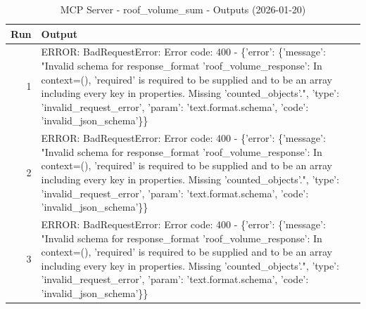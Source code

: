 \begin{table}[ht]
\centering
\small
\caption{MCP Server - roof\_volume\_sum - Outputs (2026-01-20)}
\label{tab:mcp\_roof\_volume\_sum\_outputs\_2026-01-20}
\begin{tabularx}{\linewidth}{r X}
\hline
Run & Output \\
\hline
1 & ERROR: BadRequestError: Error code: 400 - \{'error': \{'message': "Invalid schema for response\_format 'roof\_volume\_response': In context=(), 'required' is required to be supplied and to be an array including every key in properties. Missing 'counted\_objects'.", 'type': 'invalid\_request\_error', 'param': 'text.format.schema', 'code': 'invalid\_json\_schema'\}\} \\
2 & ERROR: BadRequestError: Error code: 400 - \{'error': \{'message': "Invalid schema for response\_format 'roof\_volume\_response': In context=(), 'required' is required to be supplied and to be an array including every key in properties. Missing 'counted\_objects'.", 'type': 'invalid\_request\_error', 'param': 'text.format.schema', 'code': 'invalid\_json\_schema'\}\} \\
3 & ERROR: BadRequestError: Error code: 400 - \{'error': \{'message': "Invalid schema for response\_format 'roof\_volume\_response': In context=(), 'required' is required to be supplied and to be an array including every key in properties. Missing 'counted\_objects'.", 'type': 'invalid\_request\_error', 'param': 'text.format.schema', 'code': 'invalid\_json\_schema'\}\} \\
\hline
\end{tabularx}
\end{table}
